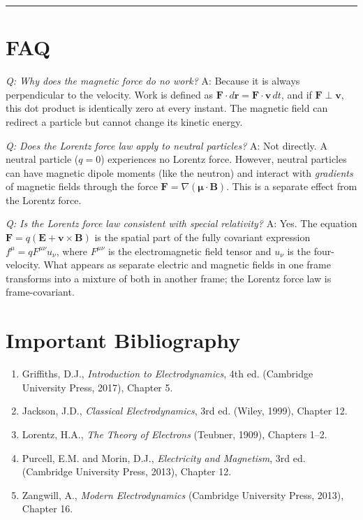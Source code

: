 \bigskip
\hrule
\bigskip
\section*{FAQ}

\textit{Q: Why does the magnetic force do no work?}
A: Because it is always perpendicular to the velocity. Work is defined as $\mathbf{F}\cdot d\mathbf{r} = \mathbf{F}\cdot\mathbf{v}\,dt$, and if $\mathbf{F}\perp\mathbf{v}$, this dot product is identically zero at every instant. The magnetic field can redirect a particle but cannot change its kinetic energy.

\textit{Q: Does the Lorentz force law apply to neutral particles?}
A: Not directly. A neutral particle ($q=0$) experiences no Lorentz force. However, neutral particles can have magnetic dipole moments (like the neutron) and interact with \emph{gradients} of magnetic fields through the force $\mathbf{F} = \nabla(\boldsymbol{\mu}\cdot\mathbf{B})$. This is a separate effect from the Lorentz force.

\textit{Q: Is the Lorentz force law consistent with special relativity?}
A: Yes. The equation $\mathbf{F} = q(\mathbf{E} + \mathbf{v}\times\mathbf{B})$ is the spatial part of the fully covariant expression $f^\mu = qF^{\mu\nu}u_\nu$, where $F^{\mu\nu}$ is the electromagnetic field tensor and $u_\nu$ is the four-velocity. What appears as separate electric and magnetic fields in one frame transforms into a mixture of both in another frame; the Lorentz force law is frame-covariant.
\section*{Important Bibliography}
\begin{enumerate}
\item Griffiths, D.J., \textit{Introduction to Electrodynamics}, 4th ed. (Cambridge University Press, 2017), Chapter 5.
\item Jackson, J.D., \textit{Classical Electrodynamics}, 3rd ed. (Wiley, 1999), Chapter 12.
\item Lorentz, H.A., \textit{The Theory of Electrons} (Teubner, 1909), Chapters 1--2.
\item Purcell, E.M. and Morin, D.J., \textit{Electricity and Magnetism}, 3rd ed. (Cambridge University Press, 2013), Chapter 12.
\item Zangwill, A., \textit{Modern Electrodynamics} (Cambridge University Press, 2013), Chapter 16.
\end{enumerate}


